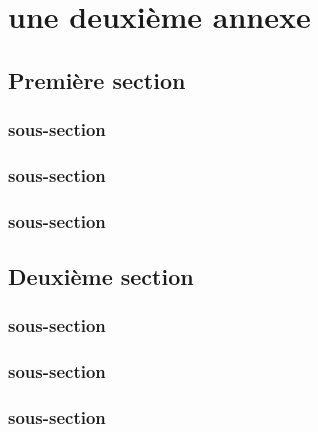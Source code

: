 \chapter{une deuxième annexe}
\section{Première section}
\subsection{sous-section}
\lipsum[2]
\subsection{sous-section}
\lipsum[2]
\subsection{sous-section}
\lipsum[2]

\section{Deuxième section}
\subsection{sous-section}
\lipsum[2]
\subsection{sous-section}
\lipsum[2]
\subsection{sous-section}
\lipsum[2]